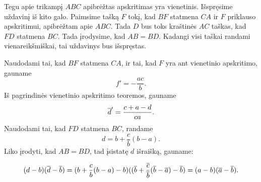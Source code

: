 \documentclass[11pt,a4paper,twoside]{book}
\begin{document}
\begin{sprendimas}
Tegu apie trikampį $ABC$ apibrėžtas apskritimas yra vienetinis. Išspręsime uždavinį iš kito galo. Paimsime tašką $F$ tokį, kad $BF$ statmena $CA$ ir $F$ priklauso apskritimui, apibrėžtam apie $ABC$. Tada $D$ bus toks kraštinės $AC$ taškas, kad $FD$ statmena $BC$. Tada įrodysime, kad $AB=BD$. Kadangi visi taškai randami vienareikšmiškai, tai uždavinys bus išspręstas.

Naudodami tai, kad $BF$ statmena $CA$, ir tai, kad $F$ yra ant vienetinio apskritimo, gauname
$$ f'= - \frac {ac}{b}.$$
Iš pagrindinės vienetinio apskritimo teoremos, gauname 
$$\overline d' = \frac {c+a-d}{ca}.$$
Naudodami tai, kad $FD$ statmena $BC$, randame
$$ d= b+ \frac {c}{b}(b-a).$$
Liko įrodyti, kad $AB=BD$, tad įsistatę $d$ išraišką, gauname:

$$ (d-b)( \overline d - \overline b)=( b+ \frac {c}{b}(b-a)-b)(( \overline b+ \frac {\overline c}{\overline b}(\overline b-\overline a)-\overline b)=(a-b)( \overline a - \overline b).$$
\end{sprendimas}
\end{document}
